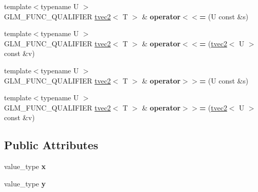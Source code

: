 \begin{DoxyCompactItemize}
\item 
\hypertarget{structglm_1_1detail_1_1tvec2_a74dc748454e218375e4b9648bdc679b8}{}{\footnotesize template$<$typename U $>$ }\\G\+L\+M\+\_\+\+F\+U\+N\+C\+\_\+\+Q\+U\+A\+L\+I\+F\+I\+E\+R \hyperlink{structglm_1_1detail_1_1tvec2}{tvec2}$<$ T $>$ \& {\bfseries operator$<$$<$=} (U const \&s)\label{structglm_1_1detail_1_1tvec2_a74dc748454e218375e4b9648bdc679b8}

\item 
\hypertarget{structglm_1_1detail_1_1tvec2_a9e883185f2abdb202660eecc3158cf1f}{}{\footnotesize template$<$typename U $>$ }\\G\+L\+M\+\_\+\+F\+U\+N\+C\+\_\+\+Q\+U\+A\+L\+I\+F\+I\+E\+R \hyperlink{structglm_1_1detail_1_1tvec2}{tvec2}$<$ T $>$ \& {\bfseries operator$<$$<$=} (\hyperlink{structglm_1_1detail_1_1tvec2}{tvec2}$<$ U $>$ const \&v)\label{structglm_1_1detail_1_1tvec2_a9e883185f2abdb202660eecc3158cf1f}

\item 
\hypertarget{structglm_1_1detail_1_1tvec2_a9f7cce4a01cec1735f8fde5c3897722b}{}{\footnotesize template$<$typename U $>$ }\\G\+L\+M\+\_\+\+F\+U\+N\+C\+\_\+\+Q\+U\+A\+L\+I\+F\+I\+E\+R \hyperlink{structglm_1_1detail_1_1tvec2}{tvec2}$<$ T $>$ \& {\bfseries operator$>$$>$=} (U const \&s)\label{structglm_1_1detail_1_1tvec2_a9f7cce4a01cec1735f8fde5c3897722b}

\item 
\hypertarget{structglm_1_1detail_1_1tvec2_a7e19b9f7439ac62aa5d14d947ada96bf}{}{\footnotesize template$<$typename U $>$ }\\G\+L\+M\+\_\+\+F\+U\+N\+C\+\_\+\+Q\+U\+A\+L\+I\+F\+I\+E\+R \hyperlink{structglm_1_1detail_1_1tvec2}{tvec2}$<$ T $>$ \& {\bfseries operator$>$$>$=} (\hyperlink{structglm_1_1detail_1_1tvec2}{tvec2}$<$ U $>$ const \&v)\label{structglm_1_1detail_1_1tvec2_a7e19b9f7439ac62aa5d14d947ada96bf}

\end{DoxyCompactItemize}
\subsection*{Public Attributes}
\begin{DoxyCompactItemize}
\item 
\hypertarget{structglm_1_1detail_1_1tvec2_a966c80effc854e7f27f9438de3a03446}{}value\+\_\+type {\bfseries x}\label{structglm_1_1detail_1_1tvec2_a966c80effc854e7f27f9438de3a03446}

\item 
\hypertarget{structglm_1_1detail_1_1tvec2_a12358d18dae79b668519773f58e5931d}{}value\+\_\+type {\bfseries y}\label{structglm_1_1detail_1_1tvec2_a12358d18dae79b668519773f58e5931d}

\end{DoxyCompactItemize}


